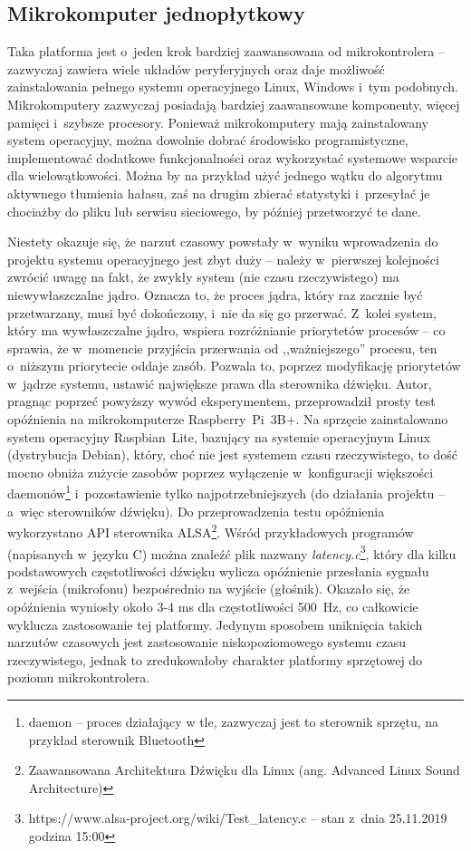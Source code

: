 \subsection{Mikrokomputer jednopłytkowy}
\label{mikrokomp}
Taka platforma jest o~jeden krok bardziej zaawansowana od mikrokontrolera -- zazwyczaj zawiera wiele układów peryferyjnych oraz daje możliwość zainstalowania pełnego systemu operacyjnego Linux, Windows i~tym podobnych. Mikrokomputery zazwyczaj posiadają bardziej zaawansowane komponenty, więcej pamięci i~szybsze procesory. Ponieważ mikrokomputery mają zainstalowany system operacyjny, można dowolnie dobrać środowisko programistyczne, implementować dodatkowe funkcjonalności oraz wykorzystać systemowe wsparcie dla wielowątkowości. Można by na przykład użyć jednego wątku do algorytmu aktywnego tłumienia hałasu, zaś na drugim zbierać statystyki i~przesyłać je chociażby do pliku lub serwisu sieciowego, by później przetworzyć te dane.

Niestety okazuje się, że narzut czasowy powstały w~wyniku wprowadzenia do projektu systemu operacyjnego jest zbyt duży -- należy w~pierwszej kolejności zwrócić uwagę na fakt, że zwykły system (nie czasu rzeczywistego) ma niewywłaszczalne jądro. Oznacza to, że proces jądra, który raz zacznie być przetwarzany, musi być dokończony, i~nie da się go przerwać. Z~kolei system, który ma wywłaszczalne jądro, wspiera rozróżnianie priorytetów procesów -- co sprawia, że w~momencie przyjścia przerwania od ,,ważniejszego'' procesu, ten o~niższym priorytecie oddaje zasób. Pozwala to, poprzez modyfikację priorytetów w~jądrze systemu, ustawić największe prawa dla sterownika dźwięku.
Autor, pragnąc poprzeć powyższy wywód eksperymentem, przeprowadził prosty test opóźnienia na mikrokomputerze Raspberry~Pi~3B+. Na sprzęcie zainstalowano system operacyjny Raspbian~Lite, bazujący na systemie operacyjnym Linux (dystrybucja Debian), który, choć nie jest systemem czasu rzeczywistego, to dość mocno obniża zużycie zasobów poprzez wyłączenie w~konfiguracji większości daemonów\footnote{daemon -- proces działający w tle, zazwyczaj jest to sterownik sprzętu, na przykład sterownik Bluetooth} i~pozostawienie tylko najpotrzebniejszych (do działania projektu -- a~więc sterowników dźwięku). Do przeprowadzenia testu opóźnienia wykorzystano API sterownika ALSA\footnote{Zaawansowana Architektura Dźwięku dla Linux (ang. Advanced Linux Sound Architecture)}. Wśród przykładowych programów (napisanych w~języku C) można znaleźć plik nazwany \textit{latency.c}\footnote{https://www.alsa-project.org/wiki/Test\_latency.c -- stan z~dnia 25.11.2019 godzina 15:00}, który dla kilku podstawowych częstotliwości dźwięku wylicza opóźnienie przesłania sygnału z~wejścia (mikrofonu) bezpośrednio na wyjście (głośnik). Okazało się, że opóźnienia wyniosły około 3-4 ms dla częstotliwości \SI{500}{\Hz}, co całkowicie wyklucza zastosowanie tej platformy. Jedynym sposobem uniknięcia takich narzutów czasowych jest zastosowanie niskopoziomowego systemu czasu rzeczywistego, jednak to zredukowałoby charakter platformy sprzętowej do poziomu mikrokontrolera.
